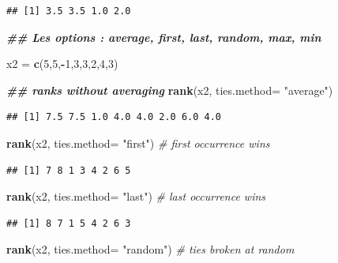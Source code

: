 \documentclass[
  12pt,
]{article}
\newenvironment{Shaded}{\begin{snugshade}}{\end{snugshade}}
\newcommand{\AttributeTok}[1]{\textcolor[rgb]{0.13,0.29,0.53}{#1}}
\newcommand{\CommentTok}[1]{\textcolor[rgb]{0.56,0.35,0.01}{\textit{#1}}}
\newcommand{\DecValTok}[1]{\textcolor[rgb]{0.00,0.00,0.81}{#1}}
\newcommand{\DocumentationTok}[1]{\textcolor[rgb]{0.56,0.35,0.01}{\textbf{\textit{#1}}}}
\newcommand{\FunctionTok}[1]{\textcolor[rgb]{0.13,0.29,0.53}{\textbf{#1}}}
\newcommand{\NormalTok}[1]{#1}
\newcommand{\OtherTok}[1]{\textcolor[rgb]{0.56,0.35,0.01}{#1}}
\newcommand{\SpecialCharTok}[1]{\textcolor[rgb]{0.81,0.36,0.00}{\textbf{#1}}}
\newcommand{\StringTok}[1]{\textcolor[rgb]{0.31,0.60,0.02}{#1}}
\begin{document}
\begin{verbatim}
## [1] 3.5 3.5 1.0 2.0
\end{verbatim}

\begin{Shaded}
\begin{Highlighting}[]
\DocumentationTok{\#\# Les options : average, first, last, random, max, min}

\NormalTok{x2 }\OtherTok{=} \FunctionTok{c}\NormalTok{(}\DecValTok{5}\NormalTok{,}\DecValTok{5}\NormalTok{,}\SpecialCharTok{{-}}\DecValTok{1}\NormalTok{,}\DecValTok{3}\NormalTok{,}\DecValTok{3}\NormalTok{,}\DecValTok{2}\NormalTok{,}\DecValTok{4}\NormalTok{,}\DecValTok{3}\NormalTok{)}

\DocumentationTok{\#\# ranks without averaging}
\FunctionTok{rank}\NormalTok{(x2, }\AttributeTok{ties.method=} \StringTok{"average"}\NormalTok{) }
\end{Highlighting}
\end{Shaded}

\begin{verbatim}
## [1] 7.5 7.5 1.0 4.0 4.0 2.0 6.0 4.0
\end{verbatim}

\begin{Shaded}
\begin{Highlighting}[]
\FunctionTok{rank}\NormalTok{(x2, }\AttributeTok{ties.method=} \StringTok{"first"}\NormalTok{)  }\CommentTok{\# first occurrence wins}
\end{Highlighting}
\end{Shaded}

\begin{verbatim}
## [1] 7 8 1 3 4 2 6 5
\end{verbatim}

\begin{Shaded}
\begin{Highlighting}[]
\FunctionTok{rank}\NormalTok{(x2, }\AttributeTok{ties.method=} \StringTok{"last"}\NormalTok{)   }\CommentTok{\#  last occurrence wins}
\end{Highlighting}
\end{Shaded}

\begin{verbatim}
## [1] 8 7 1 5 4 2 6 3
\end{verbatim}

\begin{Shaded}
\begin{Highlighting}[]
\FunctionTok{rank}\NormalTok{(x2, }\AttributeTok{ties.method=} \StringTok{"random"}\NormalTok{) }\CommentTok{\# ties broken at random}
\end{Highlighting}
\end{Shaded}
\end{document}
